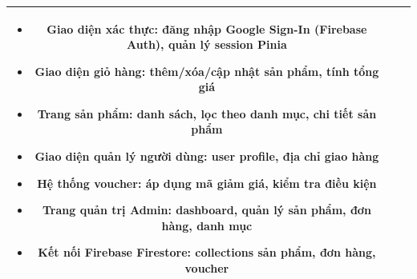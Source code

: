 \begin{longtable}{|c|>{\raggedright\arraybackslash}p{4.5cm}|>{\raggedright\arraybackslash}p{8.5cm}|}
\begin{itemize}[noitemsep, topsep=0pt, leftmargin=*]
    \item Giao diện xác thực: đăng nhập Google Sign-In (Firebase Auth), quản lý session Pinia
    \item Giao diện giỏ hàng: thêm/xóa/cập nhật sản phẩm, tính tổng giá
    \item Trang sản phẩm: danh sách, lọc theo danh mục, chi tiết sản phẩm
    \item Giao diện quản lý người dùng: user profile, địa chỉ giao hàng
    \item Hệ thống voucher: áp dụng mã giảm giá, kiểm tra điều kiện
    \item Trang quản trị Admin: dashboard, quản lý sản phẩm, đơn hàng, danh mục
    \item Kết nối Firebase Firestore: collections sản phẩm, đơn hàng, voucher
\end{itemize} \\ \hline
\end{longtable}
